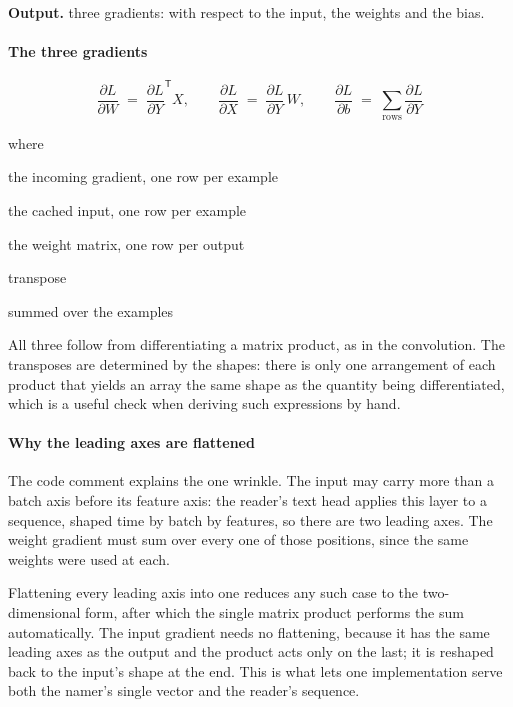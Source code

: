 \noindent\textbf{Output.} three gradients: with respect to the input, the weights and the bias.


\paragraph{The three gradients}

\begin{equation}
\frac{\partial L}{\partial W} \;=\; \frac{\partial L}{\partial Y}^{\mathsf{T}} X, \qquad \frac{\partial L}{\partial X} \;=\; \frac{\partial L}{\partial Y} \, W, \qquad \frac{\partial L}{\partial b} \;=\; \sum_{\text{rows}} \frac{\partial L}{\partial Y}
\end{equation}

\noindent where
\begin{description}[leftmargin=2.4em,style=nextline,font=\normalfont\ttfamily]\setlength\itemsep{1pt}
  \item[{$\frac{\partial L}{\partial Y}$}] \normalfont the incoming gradient, one row per example
  \item[{$X$}] \normalfont the cached input, one row per example
  \item[{$W$}] \normalfont the weight matrix, one row per output
  \item[{${}^{\mathsf{T}}$}] \normalfont transpose
  \item[{$\sum_{\text{rows}}$}] \normalfont summed over the examples
\end{description}
All three follow from differentiating a matrix product, as in the convolution. The transposes are determined by the shapes: there is only one arrangement of each product that yields an array the same shape as the quantity being differentiated, which is a useful check when deriving such expressions by hand.


\paragraph{Why the leading axes are flattened}
The code comment explains the one wrinkle. The input may carry more than a batch axis before its feature axis: the reader's text head applies this layer to a sequence, shaped time by batch by features, so there are two leading axes. The weight gradient must sum over every one of those positions, since the same weights were used at each.

Flattening every leading axis into one reduces any such case to the two-dimensional form, after which the single matrix product performs the sum automatically. The input gradient needs no flattening, because it has the same leading axes as the output and the product acts only on the last; it is reshaped back to the input's shape at the end. This is what lets one implementation serve both the namer's single vector and the reader's sequence.


